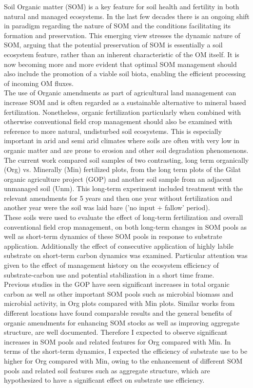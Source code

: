 	Soil Organic matter (SOM) is a key feature for soil health and fertility in both natural and managed ecosystems. In the last few decades there is an ongoing shift in paradigm regarding the nature of SOM and the conditions facilitating its formation and preservation. This emerging view stresses the dynamic nature of SOM, arguing that the potential preservation of SOM is essentially a soil ecosystem feature, rather than an inherent characteristic of the OM itself. It is now becoming more and more evident that optimal SOM management should also include the promotion of a viable soil biota, enabling the efficient processing of incoming OM fluxes.  \\
	The use of Organic amendments as part of agricultural land management can increase SOM and is often regarded as a sustainable alternative to mineral based fertilization. Nonetheless, organic fertilization particularly when combined with otherwise conventional field crop management should also be examined with reference to more natural, undisturbed soil ecosystems. This is especially important in arid and semi arid climates where soils are often with very low in organic matter and are prone to erosion and other soil degradation phenomenons.\\
	The current work compared soil samples of two contrasting, long term organically (Org) vs. Minerally (Min) fertilized plots, from the long term plots of the Gilat organic agriculture project (GOP) and another soil sample from an adjacent unmanaged soil (Unm). This long-term experiment included treatment with the relevant amendments for 5 years and then one year without fertilization and another year were the soil was laid bare ('no input + fallow' period).\\
	These soils were used to evaluate the effect of long-term fertilization and overall conventional field crop management, on both long-term changes in SOM pools as well as short-term dynamics of these SOM pools in response to substrate application. Additionally the effect of consecutive application of highly labile substrate on short-term carbon dynamics was examined. Particular attention was given to the effect of management history on the ecosystem efficiency of substrate-carbon use and potential stabilization in a short time frame.\\
	Previous studies in the GOP have seen significant increases in total organic carbon as well as other important SOM pools such as microbial biomass and microbial activity, in Org plots compared with Min plots. Similar works from different locations have found comparable results and the general benefits of organic amendments for enhancing SOM stocks as well as improving aggregate  structure, are well documented. Therefore I expected to observe significant increases in SOM pools and related features for Org compared with Min. In terms of the short-term dynamics, I expected the efficiency of substrate use to be higher for Org compared with Min, owing to the enhancement of different SOM pools and related soil features such as aggregate structure, which are hypothesized to have a significant effect on substrate use efficiency. 
